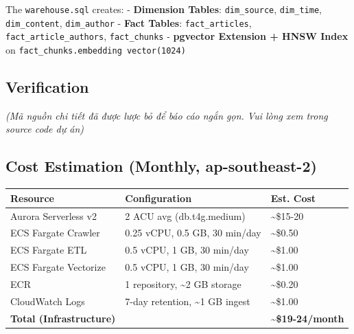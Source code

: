 \begin{Shaded}
\begin{Highlighting}[]
\OperatorTok{=}\VariableTok{$(}\VariableTok{)}

  
\end{Highlighting}
\end{Shaded}

The \texttt{warehouse.sql} creates: - \textbf{Dimension Tables}:
\texttt{dim\_source}, \texttt{dim\_time}, \texttt{dim\_content},
\texttt{dim\_author} - \textbf{Fact Tables}: \texttt{fact\_articles},
\texttt{fact\_article\_authors}, \texttt{fact\_chunks} -
\textbf{pgvector Extension + HNSW Index} on
\texttt{fact\_chunks.embedding\ vector(1024)}

\hypertarget{verification}{%
\subsection{Verification}}

\emph{(Mã nguồn chi tiết đã được lược bỏ để báo cáo ngắn gọn. Vui lòng
xem trong source code dự án)}

\hypertarget{cost-estimation-monthly-ap-southeast-2}{%
\subsection{Cost Estimation (Monthly,
ap-southeast-2)}}

\begingroup
\small
\setlength{\tabcolsep}{3pt}
\renewcommand{\arraystretch}{1.15}
\begin{longtable}[]{@{}lll@{}}
\toprule\noalign{}
Resource & Configuration & Est. Cost \\
\midrule\noalign{}
\endhead
\bottomrule\noalign{}
\endlastfoot
Aurora Serverless v2 & 2 ACU avg (db.t4g.medium) &
\textasciitilde\$15-20 \\
ECS Fargate Crawler & 0.25 vCPU, 0.5 GB, 30 min/day &
\textasciitilde\$0.50 \\
ECS Fargate ETL & 0.5 vCPU, 1 GB, 30 min/day & \textasciitilde\$1.00 \\
ECS Fargate Vectorize & 0.5 vCPU, 1 GB, 30 min/day &
\textasciitilde\$1.00 \\
ECR & 1 repository, \textasciitilde2 GB storage &
\textasciitilde\$0.20 \\
CloudWatch Logs & 7-day retention, \textasciitilde1 GB ingest &
\textasciitilde\$1.00 \\
\textbf{Total (Infrastructure)} & &
\textbf{\textasciitilde\$19-24/month} \\
\end{longtable}
\endgroup

